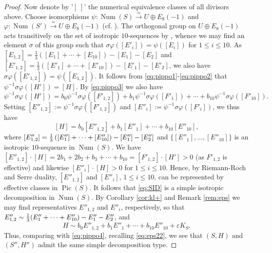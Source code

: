 \documentclass[11pt]{amsart}
\theoremstyle{definition}
\def\cong{\simeq}
\def\+{\oplus}               %
\def\Pic{\operatorname{Pic}}
\def\Num{\operatorname{Num}}
\renewcommand{\leq}{\leqslant}
\begin{document}
\begin{proof}
Now denote by '$[\;]$' the numerical equivalence classes of all divisors above.
Choose isomorphisms $\psi: \Num(S) \stackrel{\cong}{\to} U \+ E_8(-1)$
and $\varphi: \Num(S') \stackrel{\cong}{\to} U \+ E_8(-1)$ (cf. \cite[Lemma VIII.15.1]{BHPV}).
The orthogonal group on $U \+ E_8(-1)$ acts transitively on the set of isotropic $10$-sequences by \cite[Lemma 2.5.2]{cd}, whence we may find an element $\sigma$ of this group such that $\sigma\varphi([E'_i])=\psi([E_i])$ for $1 \leq i \leq 10$. As $[E_{1,2}] = \frac{1}{3}([E_1]+ \cdots +[E_{10}])-[E_1]-[E_2]$ and $[E'_{1,2}] = \frac{1}{3}([E'_1]+ \cdots +[E'_{10}])-[E'_1]-[E'_2]$, we also have $\sigma\varphi([E'_{1,2}])=\psi([E_{1,2}])$. It follows from \eqref{eq:pippo1}-\eqref{eq:pippo2} that $\psi^{-1}\sigma\varphi([H'])=[H]$. By \eqref{eq:pippo3} we also have
\[ \psi^{-1}\sigma\varphi([H'])= 
           b_0\psi^{-1}\sigma\varphi([F'_{1,2}])+b_1\psi^{-1}\sigma\varphi([F'_1])+\cdots+b_{10}\psi^{-1}\sigma\varphi([F'_{10}]).\]
Setting $[E''_{1,2}]:=\psi^{-1}\sigma\varphi([F'_{1,2}])$ and $[E''_i]:=\psi^{-1}\sigma\varphi([F'_i])$, we thus have
\begin{equation} \label{eq:SID}
 [H] = b_0[E''_{1,2}]+b_1[E''_1]+\cdots+b_{10}[E''_{10}],
\end{equation}
where $[E''_{1,2}]  =  \frac{1}{3}\left([E''_1]+ \cdots +[E''_{10}]\right)-\color{black} [E''_1]-[E''_2]\color{black}$ and $\{[E''_1],\ldots,[E''_{10}]\}$ is an isotropic $10$-sequence in $\Num(S)$. We have $[E''_{1,2}] \cdot [H]=2b_1+2b_2+b_3+\cdots+b_{10}=[F'_{1,2}] \cdot [H'] >0$ (as $F'_{1,2}$ is effective) and likewise $[E''_i] \cdot [H] >0$ for $1 \leq i \leq 10$. Hence, by Riemann-Roch and Serre duality, $[E''_{1,2}]$ and $[E''_i]$, $1 \leq i \leq 10$, can be represented by effective classes in $\Pic(S)$.  It follows that \eqref{eq:SID} is a simple isotropic decomposition in $\Num(S)$. By Corollary \ref{cor:kl+} 
and Remark \ref{rem:eps} 
we may find representatives $E''_{1,2}$ and $E''_i$, respectively, so that $E''_{1,2} \sim  \frac{1}{3}(E''_1+ \cdots +E''_{10})-\color{black} E''_1-E''_2 \color{black}$, and
\[
 H \sim b_0E''_{1,2}+b_1E''_1+\cdots+b_{10}E''_{10}+ \varepsilon K_S.
\]
Thus, comparing with \eqref{eq:pippo4}, recalling \eqref{eq:eps22}, we see 
that  $(S,H)$ and $(S'',H'')$ admit the same simple decomposition type. 
\end{proof}
\end{document}
